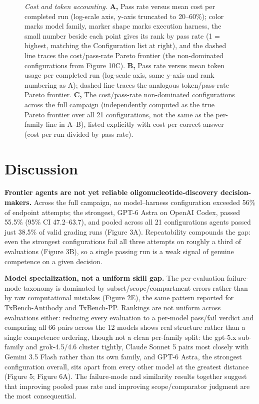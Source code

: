 \documentclass[11pt]{article}
\begin{document}
\begin{figure}[p]
\caption{\textit{Cost and token accounting.} \quad \textbf{A,} Pass rate versus mean cost per completed run (log-scale axis, y-axis truncated to 20--60\%); color marks model family, marker shape marks execution harness, the small number beside each point gives its rank by pass rate (1 = highest, matching the Configuration list at right), and the dashed line traces the cost/pass-rate Pareto frontier (the non-dominated configurations from Figure 10C). \textbf{B,} Pass rate versus mean token usage per completed run (log-scale axis, same y-axis and rank numbering as A); dashed line traces the analogous token/pass-rate Pareto frontier. \textbf{C,} The cost/pass-rate non-dominated configurations across the full campaign (independently computed as the true Pareto frontier over all 21 configurations, not the same as the per-family line in A--B), listed explicitly with cost per correct answer (cost per run divided by pass rate).}
\label{fig:fig10}
\end{figure}\section{Discussion}
\textbf{Frontier agents are not yet reliable oligonucleotide-discovery decision-makers.} Across the full campaign, no model--harness configuration exceeded 56\% of endpoint attempts; the strongest, GPT-6 Astra on OpenAI Codex, passed 55.5\% (95\% CI 47.2--63.7), and pooled across all 21 configurations agents passed just 38.5\% of valid grading runs (Figure 3A). Repeatability compounds the gap: even the strongest configurations fail all three attempts on roughly a third of evaluations (Figure 3B), so a single passing run is a weak signal of genuine competence on a given decision.

\textbf{Model specialization, not a uniform skill gap.} The per-evaluation failure-mode taxonomy is dominated by subset/scope/compartment errors  rather than by raw computational mistakes (Figure 2E), the same pattern reported for TxBench-Antibody and TxBench-PP. Rankings are not uniform across evaluations either: reducing every evaluation to a per-model pass/fail verdict and comparing all 66 pairs across the 12 models shows real structure rather than a single competence ordering, though not a clean per-family split: the gpt-5.x sub-family and grok-4.5/4.6 cluster tightly, Claude Sonnet 5 pairs most closely with Gemini 3.5 Flash rather than its own family, and GPT-6 Astra, the strongest configuration overall, sits apart from every other model at the greatest distance (Figure 5; Figure 6A). The failure-mode and similarity results together suggest that improving pooled pass rate and improving scope/comparator judgment are the most consequential.
\end{document}
